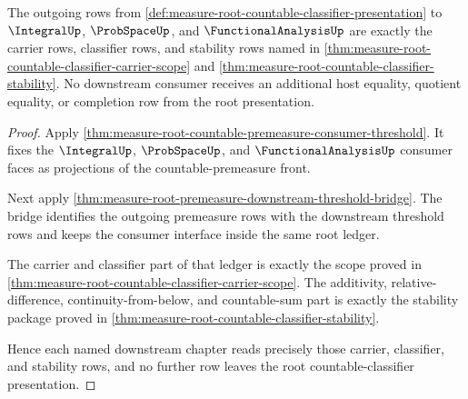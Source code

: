 \begin{theorem}
\label{thm:measure-root-countable-classifier-downstream-interface}
The outgoing rows from
\autoref{def:measure-root-countable-classifier-presentation} to
$\IntegralUp$, $\ProbSpaceUp$, and $\FunctionalAnalysisUp$ are exactly the
carrier rows, classifier rows, and stability rows named in
\autoref{thm:measure-root-countable-classifier-carrier-scope} and
\autoref{thm:measure-root-countable-classifier-stability}.  No downstream
consumer receives an additional host equality, quotient equality, or
completion row from the root presentation.
\end{theorem}
\begin{proof}
Apply
\autoref{thm:measure-root-countable-premeasure-consumer-threshold}.  It fixes
the $\IntegralUp$, $\ProbSpaceUp$, and $\FunctionalAnalysisUp$ consumer faces
as projections of the countable-premeasure front.

Next apply
\autoref{thm:measure-root-premeasure-downstream-threshold-bridge}.  The bridge
identifies the outgoing premeasure rows with the downstream threshold rows and
keeps the consumer interface inside the same root ledger.

The carrier and classifier part of that ledger is exactly the scope proved in
\autoref{thm:measure-root-countable-classifier-carrier-scope}.  The
additivity, relative-difference, continuity-from-below, and countable-sum
part is exactly the stability package proved in
\autoref{thm:measure-root-countable-classifier-stability}.

Hence each named downstream chapter reads precisely those carrier,
classifier, and stability rows, and no further row leaves the root
countable-classifier presentation.
\end{proof}
